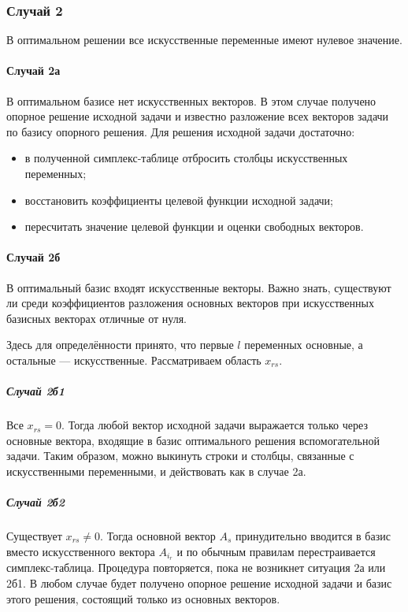 \documentclass[17pt]{extarticle}
\begin{document}
\subsubsection{Случай 2}
В оптимальном решении все искусственные переменные имеют нулевое значение.

\paragraph{Случай 2а}
В оптимальном базисе нет искусственных векторов. В этом случае получено опорное решение исходной задачи и известно разложение всех векторов задачи по базису опорного решения. Для решения исходной задачи достаточно:
\begin{itemize}
    \item в полученной симплекс-таблице отбросить столбцы искусственных переменных;
    \item восстановить коэффициенты целевой функции исходной задачи;
    \item пересчитать значение целевой функции и оценки свободных векторов.
\end{itemize}

\paragraph{Случай 2б}
В оптимальный базис входят искусственные векторы. Важно знать, существуют ли среди коэффициентов разложения основных векторов при искусственных базисных векторах отличные от нуля.


Здесь для определённости принято, что первые \( l \) переменных основные, а остальные — искусственные. Рассматриваем область \( x_{rs} \).

\subparagraph{Случай 2б1}
Все \( x_{rs} = 0 \). Тогда любой вектор исходной задачи выражается только через основные вектора, входящие в базис оптимального решения вспомогательной задачи. Таким образом, можно выкинуть строки и столбцы, связанные с искусственными переменными, и действовать как в случае 2а.

\subparagraph{Случай 2б2}
Существует \( x_{rs} \ne 0 \). Тогда основной вектор \( A_s \) принудительно вводится в базис вместо искусственного вектора \( A_{i_r} \) и по обычным правилам перестраивается симплекс-таблица. Процедура повторяется, пока не возникнет ситуация 2а или 2б1. В любом случае будет получено опорное решение исходной задачи и базис этого решения, состоящий только из основных векторов.
\end{document}
